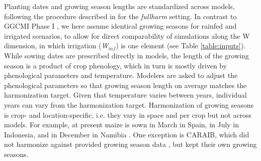 \documentclass[gmd, manuscript]{copernicus} %
\begin{document}
Planting dates and growing season lengths are standardized across models, following the procedure described in \citet{Elliott2015} for the \textit{fullharm} setting. In contrast to GGCMI Phase I \citep{Elliott2015}, we here assume identical growing seasons for rainfed and irrigated scenarios, to allow for direct comparability of simulations along the W dimension, in which irrigation (\textit{W$_{inf}$}) is one element (see Table \ref{table:inputs}). 
While sowing dates are prescribed directly in models, the length of the growing season is a product of crop phenology, which in turn is mostly driven by phenological parameters and temperature. Modelers are asked to adjust the phenological parameters so that growing season length on average matches the harmonization target. Given that temperature varies between years, individual years can vary from the harmonization target.
Harmonization of growing seasons is crop- and location-specific, i.e. they vary in space and per crop but not across models. 
For example, at present maize is sown in March in Spain, in July in Indonesia, and in December in Namibia \citep{Portmann2010}.
One exception is CARAIB, which did not harmonize against provided growing season data \citep{Elliott2015}, but kept their own growing seasons.
 
\end{document}
